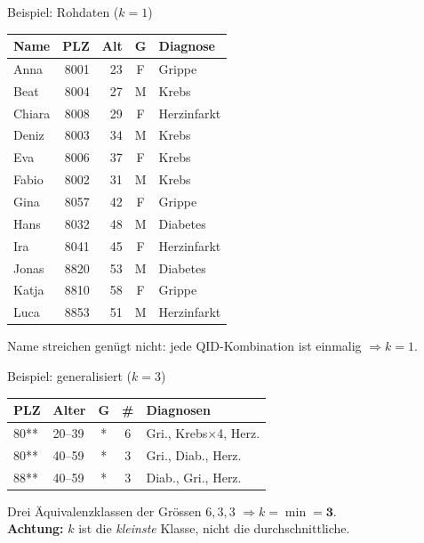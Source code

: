 \documentclass[a4paper, fontsize=7pt]{scrartcl}
\renewcommand*{\arraystretch}{1.5}  %
\begin{document}
\begin{subbox}{Beispiel: Rohdaten ($k=1$)}
\renewcommand*{\arraystretch}{1.0}
\setlength{\tabcolsep}{3pt}
\begin{center}
\begin{tabular}{@{}l|r|r|c|l@{}}
\textbf{Name} & \textbf{PLZ} & \textbf{Alt} & \textbf{G} & \textbf{Diagnose} \\
\hline
Anna & 8001 & 23 & F & Grippe \\
Beat & 8004 & 27 & M & Krebs \\
Chiara & 8008 & 29 & F & Herzinfarkt \\
Deniz & 8003 & 34 & M & Krebs \\
Eva & 8006 & 37 & F & Krebs \\
Fabio & 8002 & 31 & M & Krebs \\
Gina & 8057 & 42 & F & Grippe \\
Hans & 8032 & 48 & M & Diabetes \\
Ira & 8041 & 45 & F & Herzinfarkt \\
Jonas & 8820 & 53 & M & Diabetes \\
Katja & 8810 & 58 & F & Grippe \\
Luca & 8853 & 51 & M & Herzinfarkt \\
\end{tabular}
\end{center}
Name streichen genügt nicht: jede QID-Kombination ist einmalig
$\Rightarrow k = 1$.
\end{subbox}

\begin{subbox}{Beispiel: generalisiert ($k=3$)}
\renewcommand*{\arraystretch}{1.1}
\setlength{\tabcolsep}{3pt}
\begin{center}
\begin{tabular}{@{}l|l|c|c|l@{}}
\textbf{PLZ} & \textbf{Alter} & \textbf{G} & \textbf{\#} & \textbf{Diagnosen} \\
\hline
80** & 20--39 & * & 6 & Gri., Krebs$\times$4, Herz. \\
80** & 40--59 & * & 3 & Gri., Diab., Herz. \\
88** & 40--59 & * & 3 & Diab., Gri., Herz. \\
\end{tabular}
\end{center}
Drei Äquivalenzklassen der Grössen $6, 3, 3$
$\Rightarrow k = \min = \mathbf{3}$.\\
\textbf{Achtung:} $k$ ist die \emph{kleinste} Klasse, nicht die
durchschnittliche.
\end{subbox}
\end{document}
